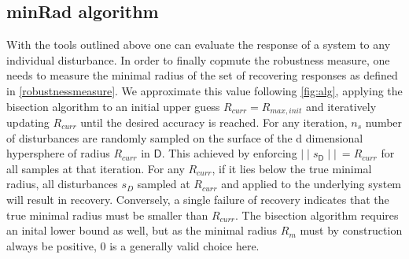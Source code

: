 



\subsection{minRad algorithm} \label{minrad}
    

    With the tools outlined above one can evaluate the response of a system to any individual disturbance. In order to finally copmute the robustness measure, one needs to measure the minimal radius of the set of recovering responses as defined in \ref{robustnessmeasure}. We approximate this value following \ref{fig:alg}, applying the bisection algorithm to an initial upper guess $R_{curr} =  R_{max,init}$ and iteratively updating $R_{curr}$ until the desired accuracy is reached. For any iteration, $n_{s}$ number of disturbances are randomly sampled on the surface of the d dimensional hypersphere of radius $R_{curr}$ in $\mathsf{D}$. This achieved by enforcing $\mid\mid s_{\mathsf{D}}\mid\mid\ = R_{curr}$ for all samples at that iteration. For any $R_{curr}$, if it lies below the true minimal radius, all disturbances ${s_D}$ sampled at $R_{curr}$ and applied to the underlying system will result in recovery. Conversely, a single failure of recovery indicates that the true minimal radius must be smaller than $R_{curr}$. The bisection algorithm requires an inital lower bound as well, but as the minimal radius $R_m$ must by construction always be positive, 0 is a generally valid choice here. 

